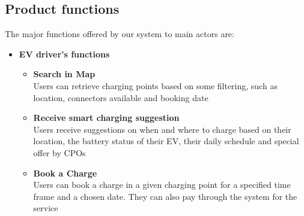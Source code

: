 \subsection{Product functions}
The major functions offered by our system to main actors are:
\begin{itemize}
      \item \textbf{EV driver's functions}
            \begin{itemize}
                  \item \textbf{Search in Map}\\
                        Users can retrieve charging points based on some filtering, such as location, connectors available and booking date
                  \item \textbf{Receive smart charging suggestion}\\
                        Users receive suggestions on when and where to charge based on their location, the battery status of their EV, their daily schedule and special offer by CPOs
                  \item \textbf{Book a Charge}\\
                        Users can book a charge in a given charging point for a specified time frame and a chosen date. They can also pay through the system for the service
            \end{itemize}
\end{itemize}
